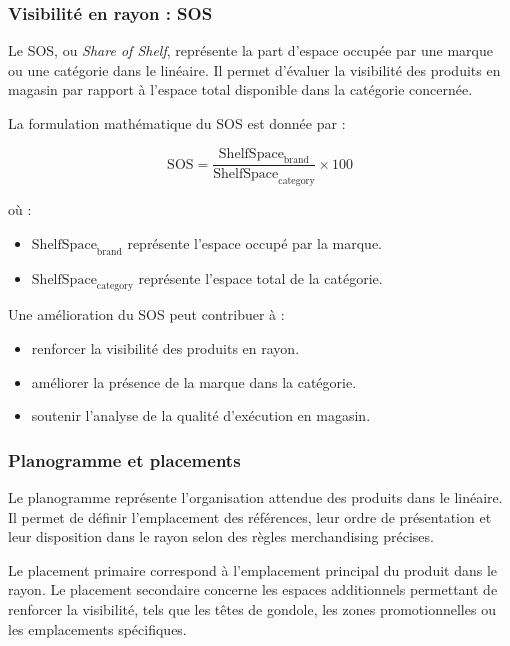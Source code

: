 
\subsubsection{Visibilité en rayon : SOS}

Le SOS, ou \textit{Share of Shelf}, représente la part d’espace occupée par une marque ou une catégorie dans le linéaire. Il permet d’évaluer la visibilité des produits en magasin par rapport à l’espace total disponible dans la catégorie concernée.

La formulation mathématique du SOS est donnée par :

\[
\mathrm{SOS} =
\frac{\mathrm{ShelfSpace}_{\mathrm{brand}}}
{\mathrm{ShelfSpace}_{\mathrm{category}}}
\times 100
\]

où :

\begin{itemize}
    \item $\mathrm{ShelfSpace}_{\mathrm{brand}}$ représente l’espace occupé par la marque.
    \item $\mathrm{ShelfSpace}_{\mathrm{category}}$ représente l’espace total de la catégorie.
\end{itemize}

Une amélioration du SOS peut contribuer à :

\begin{itemize}
    \item renforcer la visibilité des produits en rayon.
    \item améliorer la présence de la marque dans la catégorie.
    \item soutenir l’analyse de la qualité d’exécution en magasin.
\end{itemize}


\subsubsection{Planogramme et placements}

Le planogramme représente l’organisation attendue des produits dans le linéaire. Il permet de définir l’emplacement des références, leur ordre de présentation et leur disposition dans le rayon selon des règles merchandising précises.

Le placement primaire correspond à l’emplacement principal du produit dans le rayon. Le placement secondaire concerne les espaces additionnels permettant de renforcer la visibilité, tels que les têtes de gondole, les zones promotionnelles ou les emplacements spécifiques.

